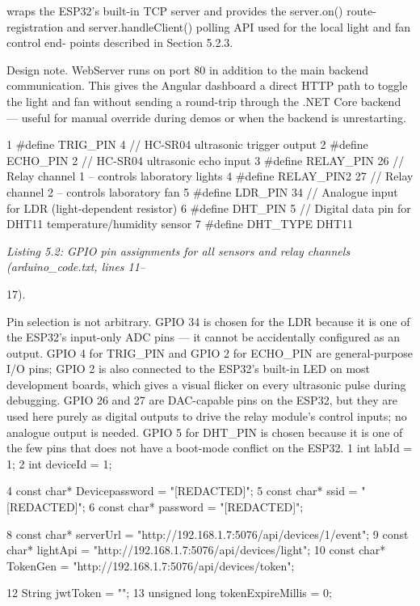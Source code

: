 wraps the ESP32's built-in TCP server and provides the server.on() route-registration
and server.handleClient() polling API used for the local light and fan control end-
points described in Section 5.2.3.


Design note. WebServer runs on port 80 in addition to the main backend communication.
This gives the Angular dashboard a direct HTTP path to toggle the light and fan without
sending a round-trip through the .NET Core backend --- useful for manual override during
demos or when the backend is unrestarting.




1 \#define TRIG\_PIN 4 // HC-SR04 ultrasonic trigger output
2 \#define ECHO\_PIN 2 // HC-SR04 ultrasonic echo input
3 \#define RELAY\_PIN 26 // Relay channel 1 -- controls laboratory lights
4 \#define RELAY\_PIN2 27 // Relay channel 2 -- controls laboratory fan
5 \#define LDR\_PIN 34 // Analogue input for LDR (light-dependent resistor)
6 \#define DHT\_PIN 5 // Digital data pin for DHT11 temperature/humidity sensor
7 \#define DHT\_TYPE DHT11


\textit{Listing 5.2: GPIO pin assignments for all sensors and relay channels (arduino\_code.txt, lines 11--}

17).


Pin selection is not arbitrary. GPIO 34 is chosen for the LDR because it is one of the
ESP32's input-only ADC pins --- it cannot be accidentally conﬁgured as an output. GPIO
4 for TRIG\_PIN and GPIO 2 for ECHO\_PIN are general-purpose I/O pins; GPIO 2 is also
connected to the ESP32's built-in LED on most development boards, which gives a visual
ﬂicker on every ultrasonic pulse during debugging. GPIO 26 and 27 are DAC-capable pins
on the ESP32, but they are used here purely as digital outputs to drive the relay module's
control inputs; no analogue output is needed. GPIO 5 for DHT\_PIN is chosen because it is
one of the few pins that does not have a boot-mode conﬂict on the ESP32.
1 int labId = 1;
2 int deviceId = 1;


4 const char* Devicepassword = "[REDACTED]";
5 const char* ssid = "[REDACTED]";
6 const char* password = "[REDACTED]";

8 const char* serverUrl = "http://192.168.1.7:5076/api/devices/1/event";
9 const char* lightApi = "http://192.168.1.7:5076/api/devices/light";
10 const char* TokenGen = "http://192.168.1.7:5076/api/devices/token";

12 String jwtToken = "";
13 unsigned long tokenExpireMillis = 0;

